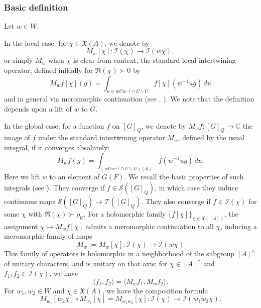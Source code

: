 \subsubsection{Basic definition}\label{sec:basic-definition-intertwining-ops}
Let $w \in W$.

In the local case, for $\chi \in \mathfrak{X}(A)$, we denote by
\begin{equation*}
  M_w[\chi] : \mathcal{I}(\chi) \rightarrow \mathcal{I}(w \chi),
\end{equation*}
or simply $M_w$ when $\chi$ is clear from context, the standard local intertwining operator, defined initially for $\Re(\chi) \succ 0$ by 
\begin{equation*}
  M_w f[\chi](g) = \int_{u \in
    w U w^{-1} \cap U \backslash  U} f[\chi](w^{-1} u g) \, d u
\end{equation*}
and in general via meromorphic continuation (see \cite[10.1.14]{MR1170566}, \cite[\S2.2]{MR610479}).  We note that the definition depends upon a lift of $w$ to $G$.

In the global case, for a function $f$ on $[G]_Q$, we denote by $M_w f : [G]_Q \rightarrow \mathbb{C}$ the image of $f$ under the standard intertwining operator $M_w$, defined by the usual integral, if it converges absolutely:
\begin{equation*}
  M_w f(g) = \int_{(w U w^{-1} \cap U \backslash U)(\mathbb{A})}
  f(w^{-1} u g) \, d u.
\end{equation*}
Here we lift $w$ to an element of $G(F)$.  We recall the basic properties of such integrals (see \cite{MR546601, 2019arXiv191102342B, MR2402686}).  They converge if $f \in \mathcal{S}([G]_Q)$, in which case they induce continuous maps $\mathcal{S}([G]_Q) \rightarrow \mathcal{T}([G]_Q)$.  They also converge if $f \in \mathcal{I}(\chi)$ for some $\chi$ with $\Re(\chi) \succ \rho_U$.  For a holomorphic family $\{f[\chi]\}_{\chi \in \mathfrak{X}([A])}$, the assignment $\chi \mapsto M_w f[\chi]$ admits a meromorphic continuation to all $\chi$, inducing a meromorphic family of maps
\begin{equation*}
  M_w := M_w[\chi] : \mathcal{I}(\chi) \rightarrow \mathcal{I}(w \chi)
\end{equation*}
This family of operators is holomorphic in a neighborhood of the subgroup $[A]^\wedge$ of unitary characters, and is unitary on that axis: for $\chi \in [A]^\wedge$ and $f_1, f_2 \in \mathcal{I}(\chi)$, we have
\begin{equation}\label{eq:langle-f_1-f_2}
  \langle f_1, f_2 \rangle = \langle M_w f_1, M_w f_2 \rangle.
\end{equation}
For $w_1, w_2 \in W$ and $\chi \in \mathfrak{X}(A)$, we have the composition formula
\begin{equation}\label{eq:m_w_1w_2-chi-circ}
  M_{w_1}[w_2 \chi] \circ M_{w_2}[\chi] = M_{w_1 w_2}[\chi] : \mathcal{I}(\chi) \rightarrow \mathcal{I}(w_1 w_2 \chi).
\end{equation}


